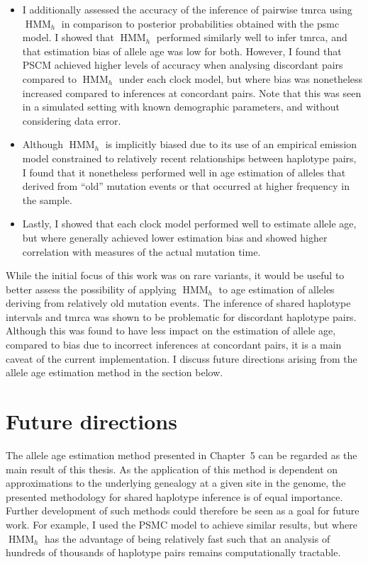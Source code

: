 \begin{itemize}
\item%
I additionally assessed the accuracy of the inference of pairwise \gls{tmrca} using $\operatorname{HMM}_h$ in comparison to posterior probabilities obtained with the \gls{psmc} model.
I showed that $\operatorname{HMM}_h$ performed similarly well to infer \gls{tmrca}, and that estimation bias of allele age was low for both.
However, I found that PSCM achieved higher levels of accuracy when analysing discordant pairs compared to $\operatorname{HMM}_h$ under each clock model, but where bias was nonetheless increased compared to inferences at concordant pairs.
Note that this was seen in a simulated setting with known demographic parameters, and without considering data error.
\item%
Although $\operatorname{HMM}_h$ is implicitly biased due to its use of an empirical emission model constrained to relatively recent relationships between haplotype pairs, I found that it nonetheless performed well in age estimation of alleles that derived from ``old'' mutation events or that occurred at higher frequency in the sample.
\item%
Lastly, I showed that each clock model performed well to estimate allele age, but where \ClockC generally achieved lower estimation bias and showed higher correlation with measures of the actual mutation time.
\end{itemize}

While the initial focus of this work was on rare variants, it would be useful to better assess the possibility of applying $\operatorname{HMM}_h$ to age estimation of alleles deriving from relatively old mutation events.
The inference of shared haplotype intervals and \gls{tmrca} was shown to be problematic for discordant haplotype pairs.
Although this was found to have less impact on the estimation of allele age, compared to bias due to incorrect inferences at concordant pairs, it is a main caveat of the current implementation.
I discuss future directions arising from the allele age estimation method in the section below.




\section{Future directions}


The allele age estimation method presented in Chapter~5 can be regarded as the main result of this thesis.
As the application of this method is dependent on approximations to the underlying genealogy at a given site in the genome, the presented methodology for shared haplotype inference is of equal importance.
Further development of such methods could therefore be seen as a goal for future work.
For example, I used the PSMC model to achieve similar results, but where $\operatorname{HMM}_h$ has the advantage of being relatively fast such that an analysis of hundreds of thousands of haplotype pairs remains computationally tractable.

